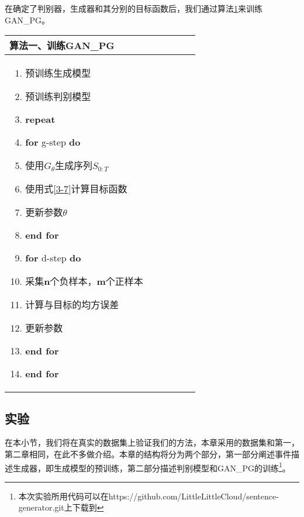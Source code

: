 \documentclass[]{template}
\begin{document}
在确定了判别器，生成器和其分别的目标函数后，我们通过算法\ref{s3-1}来训练GAN\_PG。
\linespread{0}
\begin{table}[htbp]
    \label{s3-1}
    \begin{center}
        \begin{tabular*}{.75\linewidth}{p{0.75\linewidth}}
\toprule
            算法一、训练GAN\_PG \\
\midrule
\begin{minipage}[t]{\linewidth}
\begin{enumerate}[itemsep=-2pt]
    \item 预训练生成模型
    \item 预训练判别模型
    \item \textbf{repeat}
    \item \quad \textbf{for} g-step \textbf{do}
    \item \quad \quad 使用$G_\theta$生成序列$S_{0:T}$
    \item \quad \quad 使用式\ref{3-7}计算目标函数
    \item \quad \quad 更新参数$\theta$
    \item \quad \textbf{end for}
    \item \quad \textbf{for} d-step \textbf{do}
    \item \quad \quad 采集\textbf{n}个负样本，\textbf{m}个正样本
    \item \quad \quad 计算与目标的均方误差
    \item \quad \quad 更新参数
    \item \quad \textbf{end for}  
    \item \textbf{end for}
\end{enumerate}
\end{minipage}\\
\bottomrule
        \end{tabular*}
    \end{center}
\end{table}
\linespread{1.3}

\subsection{实验}
在本小节，我们将在真实的数据集上验证我们的方法，本章采用的数据集和第一，第二章相同，在此不多做介绍。本章的结构将分为两个部分，第一部分阐述事件描述生成器，即生成模型的预训练，第二部分描述判别模型和GAN\_PG的训练\footnote{本次实验所用代码可以在https://github.com/LittleLittleCloud/sentence-generator.git上下载到}。
\end{document}
